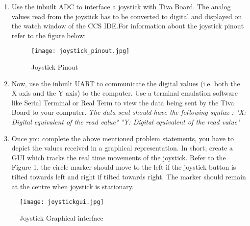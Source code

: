 \documentclass{article} %
\begin{document}
\begin{enumerate}
\item 
Use the inbuilt ADC to interface a joystick with Tiva Board. The analog values read from the joystick has to be converted to digital and displayed on the watch window of the CCS IDE.For information about the joystick pinout refer to the figure below:
\begin{figure}
\centering
\texttt{[image: joystick\_pinout.jpg]}
\caption{Joystick Pinout}
\end{figure}
\item
Now, use the inbuilt UART to communicate the digital values (i.e. both the X axis and the Y axis) to the computer. Use a terminal emulation software like Serial Terminal or Real Term to view the data being sent by the Tiva Board to your computer.
\newline
\hspace{10mm} \textit{The data sent should have the following syntax :}
\newline
\hspace{10mm}\textit{"X: Digital equivalent of the read value"}
\newline
\hspace{10mm}\textit{"Y: Digital equivalent of the read value"}
\item
Once you complete the above mentioned problem statements, you have to depict the values received in a graphical representation. In short, create a GUI which tracks the real time movements of the joystick.
\newline
Refer to the Figure 1, the circle marker should move to the left if the joystick button is tilted towards left and right if tilted towards right. The marker should remain at the centre when joystick is stationary.
\end{enumerate}
\begin{figure}
\centering
\texttt{[image: joystickgui.jpg]}
\caption{Joystick Graphical interface}
\end{figure}
\end{document}
